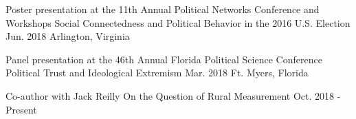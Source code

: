 

\begin{cventries}



\cventry
  {Poster presentation at the 11th Annual Political Networks Conference and Workshops} %
  {Social Connectedness and Political Behavior in the 2016 U.S. Election} %
  {Jun. 2018} %
  {Arlington, Virginia} %
  {}


\cventry
  {Panel presentation at the 46th Annual Florida Political Science Conference} %
  {Political Trust and Ideological Extremism} %
  {Mar. 2018} %
  {Ft. Myers, Florida} %
  {}

\cventry
  {Co-author with Jack Reilly} %
  {On the Question of Rural Measurement} %
  {Oct. 2018 - Present} %
  {} %
  {}


\end{cventries}
